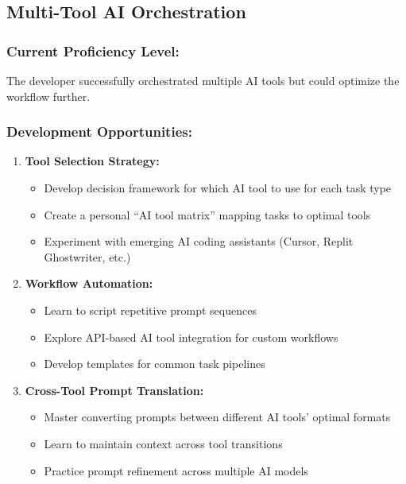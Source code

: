 \documentclass[12pt,a4paper]{article}
\begin{document}
\subsection{Multi-Tool AI Orchestration}

\subsubsection*{Current Proficiency Level:}
The developer successfully orchestrated multiple AI tools but could optimize the workflow further.

\subsubsection*{Development Opportunities:}

\begin{enumerate}
    \item \textbf{Tool Selection Strategy:}
    \begin{itemize}
        \item Develop decision framework for which AI tool to use for each task type
        \item Create a personal ``AI tool matrix'' mapping tasks to optimal tools
        \item Experiment with emerging AI coding assistants (Cursor, Replit Ghostwriter, etc.)
    \end{itemize}
    
    \item \textbf{Workflow Automation:}
    \begin{itemize}
        \item Learn to script repetitive prompt sequences
        \item Explore API-based AI tool integration for custom workflows
        \item Develop templates for common task pipelines
    \end{itemize}
    
    \item \textbf{Cross-Tool Prompt Translation:}
    \begin{itemize}
        \item Master converting prompts between different AI tools' optimal formats
        \item Learn to maintain context across tool transitions
        \item Practice prompt refinement across multiple AI models
    \end{itemize}
\end{enumerate}
\end{document}
